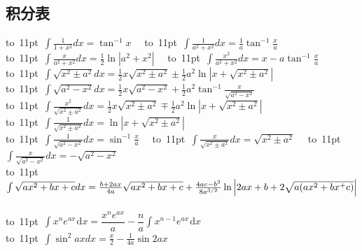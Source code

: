 \subsection{积分表}
\begin{footnotesize}
\noindent
\mbox{\vbox to 11pt{  \hbox{$
\int \frac{1}{1+x^2}dx = \tan^{-1}x
$}  }}
\
\mbox{\vbox to 11pt{  \hbox{$
\int \frac{1}{a^2+x^2}dx = \frac{1}{a}\tan^{-1}\frac{x}{a}
$}  }}
\\
\mbox{\vbox to 11pt{  \hbox{$
\int \frac{x}{a^2+x^2}dx = \frac{1}{2}\ln|a^2+x^2|
$}  }}
\
\mbox{\vbox to 11pt{  \hbox{$
\int \frac{x^2}{a^2+x^2}dx = x-a\tan^{-1}\frac{x}{a}
$}  }}
\\
\mbox{\vbox to 11pt{  \hbox{$
\int\sqrt{x^2 \pm a^2} dx  = \frac{1}{2}x\sqrt{x^2\pm a^2} 
\pm\frac{1}{2}a^2 \ln \left | x + \sqrt{x^2\pm a^2} \right | 
$}  }}
\\
\mbox{\vbox to 11pt{  \hbox{$
\int  \sqrt{a^2 - x^2} dx  = \frac{1}{2} x \sqrt{a^2-x^2} 
+\frac{1}{2}a^2\tan^{-1}\frac{x}{\sqrt{a^2-x^2}}
$}  }}
\\
\mbox{\vbox to 11pt{  \hbox{$
\int \frac{x^2}{\sqrt{x^2 \pm a^2}} dx  = \frac{1}{2}x\sqrt{x^2 \pm a^2}
\mp \frac{1}{2}a^2 \ln \left| x + \sqrt{x^2\pm a^2} \right | 
$}  }}
\\
\mbox{\vbox to 11pt{  \hbox{$
\int \frac{1}{\sqrt{x^2 \pm a^2}} dx = \ln \left | x + \sqrt{x^2 \pm a^2} \right | 
$}  }}
\\
\mbox{\vbox to 11pt{  \hbox{$
\int \frac{1}{\sqrt{a^2 - x^2}} dx = \sin^{-1}\frac{x}{a} 
$}  }}
\
\mbox{\vbox to 11pt{  \hbox{$
\int \frac{x}{\sqrt{x^2\pm a^2}}dx = \sqrt{x^2 \pm a^2} 
$}  }}
\
\mbox{\vbox to 11pt{  \hbox{$
\int \frac{x}{\sqrt{a^2-x^2}}dx = -\sqrt{a^2-x^2} 
$}  }}
\\
\mbox{\vbox to 11pt{  \hbox{$
\int  \sqrt{a x^2 + b x + c} dx = 
\frac{b+2ax}{4a}\sqrt{ax^2+bx+c}
\nonumber \\  
+
\frac{4ac-b^2}{8a^{3/2}}\ln \left| 2ax + b + 2\sqrt{a(ax^2+bx^+c)}\right |
$}  }}
\\
\mbox{\vbox to 11pt{  \hbox{$
\int x^n e^{ax}\hspace{1pt}\text{d}x = \dfrac{x^n e^{ax}}{a} - 
\dfrac{n}{a}\int x^{n-1}e^{ax}\hspace{1pt}\text{d}x
$}  }} 
\\
\mbox{\vbox to 11pt{  \hbox{$
\int \sin^2 ax dx = \frac{x}{2} - \frac{1} {4a} \sin{2ax}
$}  }}

\end{footnotesize}
